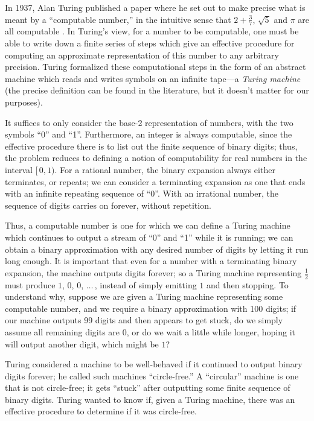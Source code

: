 \documentclass[../generics]{subfiles}
\begin{document}
In 1937, Alan Turing published a paper where he set out to make precise what is meant by a ``computable number,'' in the intuitive sense that $2+\frac{3}{7}$, $\sqrt{5}$ and $\pi$ are all computable \cite{turing}. In Turing's view, for a number to be computable, one must be able to write down a finite series of steps which give an effective procedure for computing an approximate representation of this number to any arbitrary precision. Turing formalized these computational steps in the form of an abstract machine which reads and writes symbols on an infinite tape---a \emph{Turing machine} (the precise definition can be found in the literature, but it doesn't matter for our purposes).

It suffices to only consider the base-2 representation of numbers, with the two symbols ``0'' and ``1''. Furthermore, an integer is always computable, since the effective procedure there is to list out the finite sequence of binary digits; thus, the problem reduces to defining a notion of computability for real numbers in the interval $[\,0, 1)$. For a rational number, the binary expansion always either terminates, or repeats; we can consider a terminating expansion as one that ends with an infinite repeating sequence of ``0''. With an irrational number, the sequence of digits carries on forever, without repetition.

Thus, a computable number is one for which we can define a Turing machine which continues to output a stream of ``0'' and ``1'' while it is running; we can obtain a binary approximation with any desired number of digits by letting it run long enough. It is important that even for a number with a terminating binary expansion, the machine outputs digits forever; so a Turing machine representing $\frac{1}{2}$ must produce $1$, $0$, $0$, $\ldots$\,, instead of simply emitting $1$ and then stopping. To understand why, suppose we are given a Turing machine representing some computable number, and we require a binary approximation with 100 digits; if our machine outputs 99 digits and then appears to get stuck, do we simply assume all remaining digits are 0, or do we wait a little while longer, hoping it will output another digit, which might be $1$?

Turing considered a machine to be well-behaved if it continued to output binary digits forever; he called such machines ``circle-free.'' A ``circular'' machine is one that is not circle-free; it gets ``stuck'' after outputting some finite sequence of binary digits. Turing wanted to know if, given a Turing machine, there was an effective procedure to determine if it was circle-free.
\end{document}
